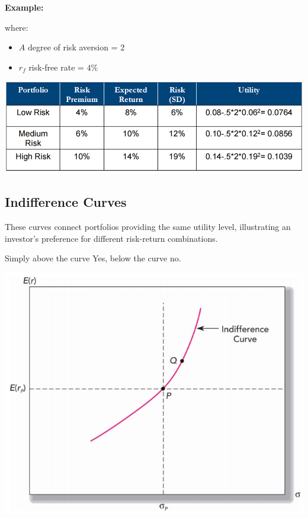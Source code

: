 \documentclass[
]{book}
\providecommand{\tightlist}{%
  \setlength{\itemsep}{0pt}\setlength{\parskip}{0pt}}
\begin{document}
\textbf{Example:}

where:

\begin{itemize}
\tightlist
\item
  \(A\) degree of risk aversion = \(2\)
\item
  \(r_f\) risk-free rate = \(4\%\)
\end{itemize}

\includegraphics{Resources/utilisation.png}

\hypertarget{indifference-curves}{%
\subsection{Indifference Curves}\label{indifference-curves}}

These curves connect portfolios providing the same utility level, illustrating an investor's preference for different risk-return combinations.

Simply above the curve Yes, below the curve no.

\includegraphics{Resources/indiffcurve.png}
\end{document}
